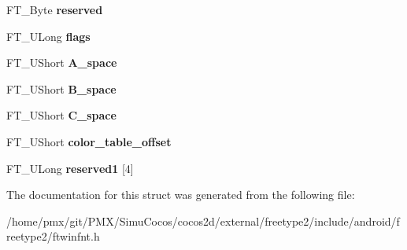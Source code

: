 \begin{DoxyCompactItemize}
\mbox{\label{structFT__WinFNT__HeaderRec___a802cb51af97c1f9c556d1db71e2ea51a}} 
F\+T\+\_\+\+Byte {\bfseries reserved}
\item 
\mbox{\label{structFT__WinFNT__HeaderRec___ac3230b8c51250b5c1e48c8e38c44d6f6}} 
F\+T\+\_\+\+U\+Long {\bfseries flags}
\item 
\mbox{\label{structFT__WinFNT__HeaderRec___ad97f5f84ac213c1fb59ceeafc689f381}} 
F\+T\+\_\+\+U\+Short {\bfseries A\+\_\+space}
\item 
\mbox{\label{structFT__WinFNT__HeaderRec___aabd41a485124b6c4220fc4622525608e}} 
F\+T\+\_\+\+U\+Short {\bfseries B\+\_\+space}
\item 
\mbox{\label{structFT__WinFNT__HeaderRec___a1173b4d5c809db01edf4ff2185e1d43b}} 
F\+T\+\_\+\+U\+Short {\bfseries C\+\_\+space}
\item 
\mbox{\label{structFT__WinFNT__HeaderRec___a83fa51bfd7fe814f8264416204701c60}} 
F\+T\+\_\+\+U\+Short {\bfseries color\+\_\+table\+\_\+offset}
\item 
\mbox{\label{structFT__WinFNT__HeaderRec___ab123daae9a677742c069c8a7c88cb804}} 
F\+T\+\_\+\+U\+Long {\bfseries reserved1} \mbox{[}4\mbox{]}
\end{DoxyCompactItemize}


The documentation for this struct was generated from the following file\+:\begin{DoxyCompactItemize}
\item 
/home/pmx/git/\+P\+M\+X/\+Simu\+Cocos/cocos2d/external/freetype2/include/android/freetype2/ftwinfnt.\+h\end{DoxyCompactItemize}
